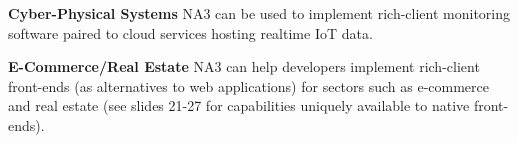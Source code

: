\begin{frame}{}
{\begin{minipage}{.99\textwidth}
{\begin{enumerate}
\vspace{16pt}
\dmitem \textbf{Cyber-Physical Systems}  \hspace{.5em} 
NA3 can be used to implement rich-client monitoring 
software paired to cloud services hosting 
realtime IoT data.

\vspace{16pt}
\dmitem \textbf{E-Commerce/Real Estate}  \hspace{.5em} 
NA3 can help developers implement 
rich-client front-ends (as 
alternatives to web applications) for sectors such 
as e-commerce and real estate (see slides 21-27 
for capabilities uniquely available to native front-ends).
\end{enumerate}
}

\end{minipage}
}


\end{frame}

